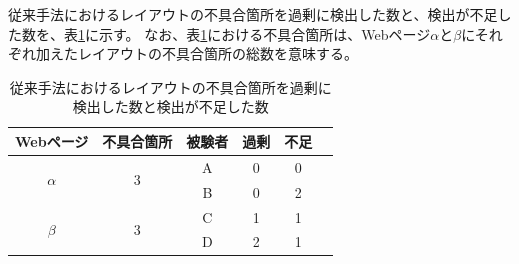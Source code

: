 従来手法におけるレイアウトの不具合箇所を過剰に検出した数と、検出が不足した数を、表\ref{tb:result_detect}に示す。
なお、表\ref{tb:result_detect}における不具合箇所は、Webページ$\alpha$と$\beta$にそれぞれ加えたレイアウトの不具合箇所の総数を意味する。
\begin{table}[tp]
    \centering
    \caption{従来手法におけるレイアウトの不具合箇所を過剰に検出した数と検出が不足した数}
    \label{tb:result_detect}
    \begin{tabular}{c||c|c|c|c|c}
        Webページ                 & 不具合箇所         & 被験者 & 過剰 & 不足 & \\
        \hline \hline
        \multirow{2}{*}{$\alpha$} & \multirow{2}{*}{3} & A      & 0    & 0    & \\
        \cline{3-6}
                                  &                    & B      & 0    & 2    & \\
        \hline
        \multirow{2}{*}{$\beta$}  & \multirow{2}{*}{3} & C      & 1    & 1    & \\
        \cline{3-6}
                                  &                    & D      & 2    & 1    & \\
        \hline \hline
    \end{tabular}
\end{table}

